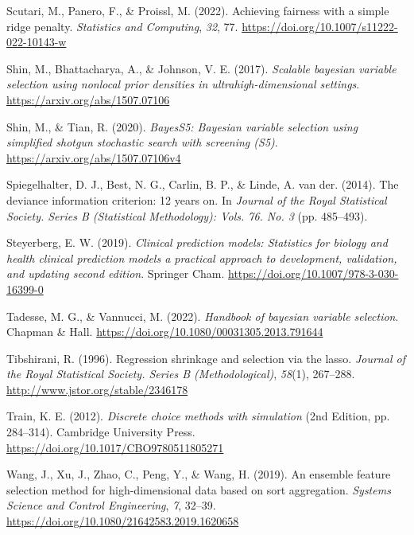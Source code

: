 \documentclass[
  11pt,
]{article}
\newlength{\cslhangindent}
\newlength{\cslentryspacingunit} %
\newenvironment{CSLReferences}[2] %
 {%
  \setlength{\parindent}{0pt}
  \ifodd #1
  \let\oldpar\par
  \def\par{\hangindent=\cslhangindent\oldpar}
  \fi
  \setlength{\parskip}{#2\cslentryspacingunit}
 }%
 {}
\begin{document}
\begin{CSLReferences}{1}{0}
\leavevmode{}%
Scutari, M., Panero, F., \& Proissl, M. (2022). Achieving fairness with
a simple ridge penalty. \emph{Statistics and Computing}, \emph{32}, 77.
\url{https://doi.org/10.1007/s11222-022-10143-w}

\leavevmode{}%
Shin, M., Bhattacharya, A., \& Johnson, V. E. (2017). \emph{Scalable
bayesian variable selection using nonlocal prior densities in
ultrahigh-dimensional settings}. \url{https://arxiv.org/abs/1507.07106}

\leavevmode{}%
Shin, M., \& Tian, R. (2020). \emph{BayesS5: Bayesian variable selection
using simplified shotgun stochastic search with screening (S5)}.
\url{https://arxiv.org/abs/1507.07106v4}

\leavevmode{}%
Spiegelhalter, D. J., Best, N. G., Carlin, B. P., \& Linde, A. van der.
(2014). The deviance information criterion: 12 years on. In
\emph{Journal of the Royal Statistical Society. Series B (Statistical
Methodology): Vols. 76. No. 3} (pp. 485--493).

\leavevmode{}%
Steyerberg, E. W. (2019). \emph{Clinical prediction models: Statistics
for biology and health clinical prediction models a practical approach
to development, validation, and updating second edition}. Springer Cham.
\url{https://doi.org/10.1007/978-3-030-16399-0}

\leavevmode{}%
Tadesse, M. G., \& Vannucci, M. (2022). \emph{Handbook of bayesian
variable selection}. Chapman \& Hall.
\url{https://doi.org/10.1080/00031305.2013.791644}

\leavevmode{}%
Tibshirani, R. (1996). Regression shrinkage and selection via the lasso.
\emph{Journal of the Royal Statistical Society. Series B
(Methodological)}, \emph{58}(1), 267--288.
\url{http://www.jstor.org/stable/2346178}

\leavevmode{}%
Train, K. E. (2012). \emph{Discrete choice methods with simulation} (2nd
Edition, pp. 284--314). Cambridge University Press.
\url{https://doi.org/10.1017/CBO9780511805271}

\leavevmode{}%
Wang, J., Xu, J., Zhao, C., Peng, Y., \& Wang, H. (2019). An ensemble
feature selection method for high-dimensional data based on sort
aggregation. \emph{Systems Science and Control Engineering}, \emph{7},
32--39. \url{https://doi.org/10.1080/21642583.2019.1620658}


\end{CSLReferences}
\end{document}
